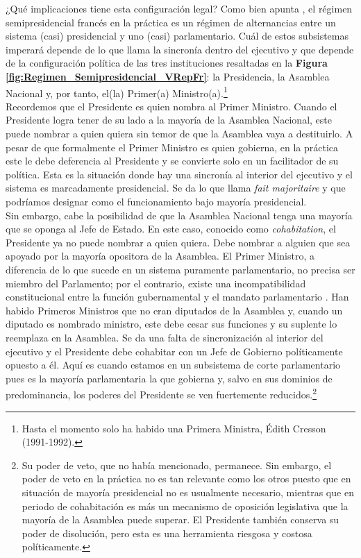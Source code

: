 ¿Qué implicaciones tiene esta configuración legal? Como bien apunta \textcite{Carpizo04}, el régimen semipresidencial francés en la práctica es un régimen de alternancias entre un sistema (casi) presidencial y uno (casi) parlamentario. Cuál de estos subsistemas imperará depende de lo que \textcite{Marrani09} llama la sincronía dentro del ejecutivo y que depende de la configuración política de las tres instituciones resaltadas en la \textbf{Figura \ref{fig:Regimen_Semipresidencial_VRepFr}}: la Presidencia, la Asamblea Nacional y, por tanto, el(la) Primer(a) Ministro(a).\footnote{Hasta el momento solo ha habido una Primera Ministra, Édith Cresson (1991-1992).}\\ 

Recordemos que el Presidente es quien nombra al Primer Ministro. Cuando el Presidente logra tener de su lado a la mayoría de la Asamblea Nacional, este puede nombrar a quien quiera sin temor de que la Asamblea vaya a destituirlo. A pesar de que formalmente el Primer Ministro es quien gobierna, en la práctica este le debe deferencia al Presidente y se convierte solo en un facilitador de su política. Esta es la situación donde hay una sincronía al interior del ejecutivo y el sistema es marcadamente presidencial. Se da lo que \citeauthor{Marrani09} llama \textit{fait majoritaire} y que podríamos designar como el funcionamiento bajo mayoría presidencial.\\ 

Sin embargo, cabe la posibilidad de que la Asamblea Nacional tenga una mayoría que se oponga al Jefe de Estado. En este caso, conocido como \textit{cohabitation}, el Presidente ya no puede nombrar a quien quiera. Debe nombrar a alguien que sea apoyado por la mayoría opositora de la Asamblea. El Primer Ministro, a diferencia de lo que sucede en un sistema puramente parlamentario, no precisa ser miembro del Parlamento; por el contrario, existe una incompatibilidad constitucional entre la función gubernamental y el mandato parlamentario \parencite{ConstFr}. Han habido Primeros Ministros que no eran diputados de la Asamblea y, cuando un diputado es nombrado ministro, este debe cesar sus funciones y su suplente lo reemplaza en la Asamblea. Se da una falta de sincronización al interior del ejecutivo y el Presidente debe cohabitar con un Jefe de Gobierno políticamente opuesto a él. Aquí es cuando estamos en un subsistema de corte parlamentario pues es la mayoría parlamentaria la que gobierna y, salvo en sus dominios de predominancia, los poderes del Presidente se ven fuertemente reducidos.\footnote{Su poder de veto, que no había mencionado, permanece. Sin embargo, el poder de veto en la práctica no es tan relevante como los otros puesto que en situación de mayoría presidencial no es usualmente necesario, mientras que en periodo de cohabitación es más un mecanismo de oposición legislativa que la mayoría de la Asamblea puede superar. El Presidente también conserva su poder de disolución, pero esta es una herramienta riesgosa y costosa políticamente.}\\ 

